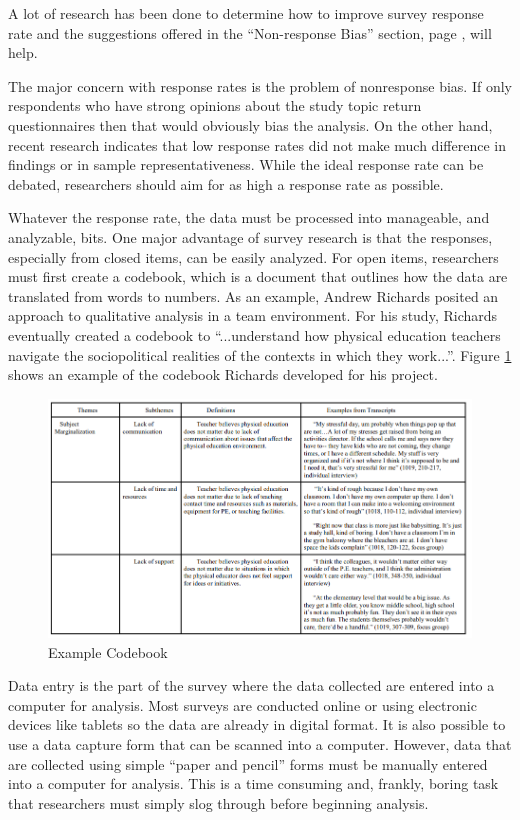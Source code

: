 A lot of research has been done to determine how to improve survey response rate and the suggestions offered in the ``Non-response Bias'' section, page \pageref{08:nonresponse}, will help.

The major concern with response rates is the problem of nonresponse bias. If only respondents who have strong opinions about the study topic return questionnaires then that would obviously bias the analysis. On the other hand, recent research indicates that low response rates did not make much difference in findings or in sample representativeness\cite{rindfuss2015low}\cite{wright2015empirical}. While the ideal response rate can be debated, researchers should aim for as high a response rate as possible.

Whatever the response rate, the data must be processed into manageable, and analyzable, bits. One major advantage of survey research is that the responses, especially from closed items, can be easily analyzed. For open items, researchers must first create a codebook, which is a document that outlines how the data are translated from words to numbers. As an example, Andrew Richards posited an approach to qualitative analysis in a team environment\cite{richards2018practical}. For his study, Richards eventually created a codebook to ``...understand how physical education teachers navigate the sociopolitical realities of the contexts in which they work...''. Figure \ref{fig08.02} shows an example of the codebook Richards developed for his project.

\begin{figure}[H]
	\centering
	\includegraphics[width=\maxwidth{.95\linewidth}]{gfx/08-codebook}
	\caption{Example Codebook}
	\label{fig08.02}
\end{figure}

Data entry is the part of the survey where the data collected are entered into a computer for analysis. Most surveys are conducted online or using electronic devices like tablets so the data are already in digital format. It is also possible to use a data capture form that can be scanned into a computer. However, data that are collected using simple ``paper and pencil'' forms must be manually entered into a computer for analysis. This is a time consuming and, frankly, boring task that researchers must simply slog through before beginning analysis.

